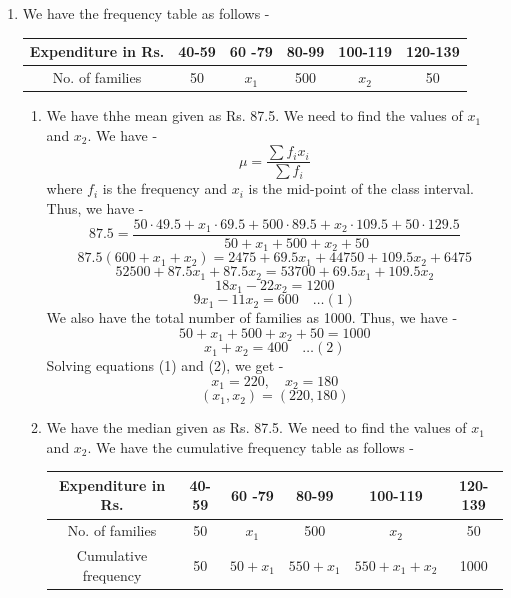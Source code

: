 \chapter{}
\begin{enumerate}
    \item We have the frequency table as follows - 
    \begin{center}
        \begin{tabular}{|c|ccccc|}
            \hline
            Expenditure in Rs. & 40-59 & 60 -79 & 80-99 & 100-119 & 120-139 \\
            \hline
            No. of families & 50 & $x_1$ & 500 & $x_2$ & 50 \\
            \hline
        \end{tabular}
    \end{center}
    \begin{enumerate}
        \item We have thhe mean given as Rs. 87.5. We need to find the values of $x_1$ and $x_2$. We have -
    \[\mu = \frac{\sum f_i x_i}{\sum f_i}\]
    where $f_i$ is the frequency and $x_i$ is the mid-point of the class interval. Thus, we have -
    \[87.5 = \frac{50 \cdot 49.5 + x_1 \cdot 69.5 + 500 \cdot 89.5 + x_2 \cdot 109.5 + 50 \cdot 129.5}{50 + x_1 + 500 + x_2 + 50}\]
    \[87.5 (600 + x_1 + x_2) = 2475 + 69.5 x_1 + 44750 + 109.5 x_2 + 6475\]
    \[52500 + 87.5 x_1 + 87.5 x_2 = 53700 + 69.5 x_1 + 109.5 x_2\]
    \[18 x_1 - 22 x_2 = 1200\]
    \[9 x_1 - 11 x_2 = 600 \quad \ldots (1)\]
    We also have the total number of families as 1000. Thus, we have -
    \[50 + x_1 + 500 + x_2 + 50 = 1000\]
    \[x_1 + x_2 = 400 \quad \ldots (2)\]
    Solving equations (1) and (2), we get -
    \[x_1 = 220, \quad x_2 = 180\]
    \[\boxed{(x_1, x_2) = (220, 180)
    }\]
    \item We have the median given as Rs. 87.5. We need to find the values of $x_1$ and $x_2$. We have the cumulative frequency table as follows -
    \begin{center}
        \begin{tabular}{|c|ccccc|}
            \hline
            Expenditure in Rs. & 40-59 & 60 -79 & 80-99 & 100-119 & 120-139 \\
            \hline
            No. of families & 50 & $x_1$ & 500 & $x_2$ & 50 \\
            Cumulative frequency & 50 & $50 + x_1$ & $550 + x_1$ & $550 + x_1 + x_2$ & 1000 \\
            \hline
        \end{tabular}

\end{center}
\end{enumerate}
\end{enumerate}
